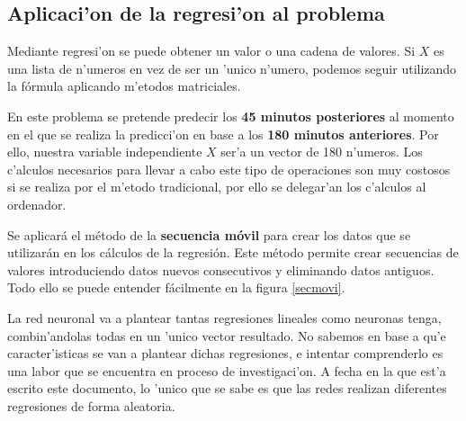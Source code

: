 \clearpage

\subsection{Aplicaci'on de la regresi'on al problema}

Mediante regresi'on se puede obtener un valor o una cadena de valores. Si $ X $ es una lista de n'umeros en vez de ser un 'unico n'umero, podemos seguir utilizando la fórmula aplicando m'etodos matriciales. 

En este problema se pretende predecir los \textbf{45 minutos posteriores} al momento en el que se realiza la predicci'on en base a los \textbf{180 minutos anteriores}. Por ello, nuestra variable independiente $ X $ ser'a un vector de 180 n'umeros. 
Los c'alculos necesarios para llevar a cabo este tipo de operaciones son muy costosos si se realiza por el m'etodo tradicional, por ello se delegar'an los c'alculos al ordenador. 

Se aplicará el método de la \textbf{secuencia móvil} para crear los datos que se utilizarán en los cálculos de la regresión. Este método permite crear secuencias de valores introduciendo datos nuevos consecutivos y eliminando datos antiguos. Todo ello se puede entender fácilmente en la figura \ref{secmovi}.


La red neuronal va a plantear tantas regresiones lineales como neuronas tenga, combin'andolas todas en un 'unico vector resultado. No sabemos en base a qu'e caracter'isticas se van a plantear dichas regresiones, e intentar comprenderlo es una labor que se encuentra en proceso de investigaci'on. A fecha en la que est'a escrito este documento, lo 'unico que se sabe es que las redes realizan diferentes regresiones de forma aleatoria. 



\clearpage




